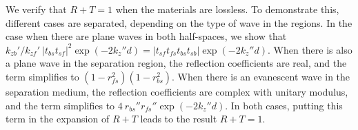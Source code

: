 We verify that $R+T=1$ when the materials are lossless.
To demonstrate this, different cases are separated, depending on the type of wave in the regions.
In the case when there are plane waves in both half-spaces, we show that 
$
k_{zb}'/k_{zf}'\ |t_{bs}t_{sf}|^2 \exp(-2 k_z'' d)
= |t_{sf} t_{fs} t_{bs} t_{sb}| \exp(-2 k_z'' d)
$.
When there is also a plane wave in the separation region, the reflection coefficients are real, and the term simplifies to 
$(1-r_{fs}^2)(1-r_{bs}^2)$.
When there is an evanescent wave in the separation medium, the reflection coefficients are complex with unitary modulus, and the term simplifies to 
$4\ r_{bs}'' r_{fs}'' \exp(-2 k_z'' d)$.
In both cases, putting this term in the expansion of $R+T$ leads to the result
$R+T=1$.

